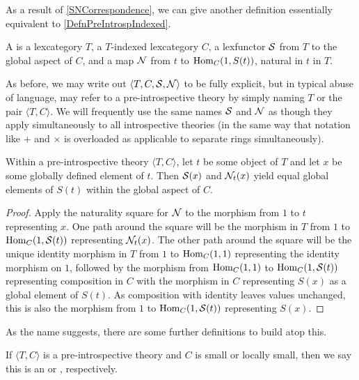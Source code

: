 As a result of \cref{SNCorrespondence}, we can give another definition essentially equivalent to \cref{DefnPreIntrospIndexed}.

\begin{definition}\label{DefnPreIntrospSN}
A  is a lexcategory $T$, a $T$-indexed lexcategory $C$, a lexfunctor $\mathcal{S}$ from $T$ to the global aspect of $C$, and a map $\mathcal{N}$ from $t$ to $\operatorname{Hom}_C(1, S(t))$, natural in $t$ in $T$.
\end{definition}

As before, we may write out $\langle T, C, \mathcal{S}, \mathcal{N} \rangle$ to be fully explicit, but in typical abuse of language, may refer to a pre-introspective theory by simply naming $T$ or the pair $\langle T, C\rangle$. We will frequently use the same names $\mathcal{S}$ and $\mathcal{N}$ as though they apply simultaneously to all introspective theories (in the same way that notation like $+$ and $\times$ is overloaded as applicable to separate rings simultaneously).

\begin{lemma}\label{SMatchesN}
Within a pre-introspective theory $\langle T, C \rangle$, let $t$ be some object of $T$ and let $x$ be some globally defined element of $t$. Then $\mathcal{S}(x)$ and $\mathcal{N}_t(x)$ yield equal global elements of $S(t)$ within the global aspect of $C$.
\end{lemma}
\begin{proof}
Apply the naturality square for $\mathcal{N}$ to the morphism from $1$ to $t$ representing $x$. One path around the square will be the morphism in $T$ from $1$ to $\operatorname{Hom}_C(1, \mathcal{S}(t))$ representing $\mathcal{N}_t(x)$. The other path around the square will be the unique identity morphism in $T$ from $1$ to $\operatorname{Hom}_C(1, 1)$ representing the identity morphism on $1$, followed by the morphism from $\operatorname{Hom}_C(1, 1)$ to $\operatorname{Hom}_C(1, \mathcal{S}(t))$ representing composition in $C$ with the morphism in $C$ representing $S(x)$ as a global element of $S(t)$. As composition with identity leaves values unchanged, this is also the morphism from $1$ to $\operatorname{Hom}_C(1, \mathcal{S}(t))$ representing $S(x)$.
\end{proof}

As the name  suggests, there are some further definitions to build atop this.

\begin{definition}\label{DefnIntrosp}
If $\langle T, C \rangle$ is a pre-introspective theory and $C$ is small or locally small, then we say this is an  or , respectively.
\end{definition}

